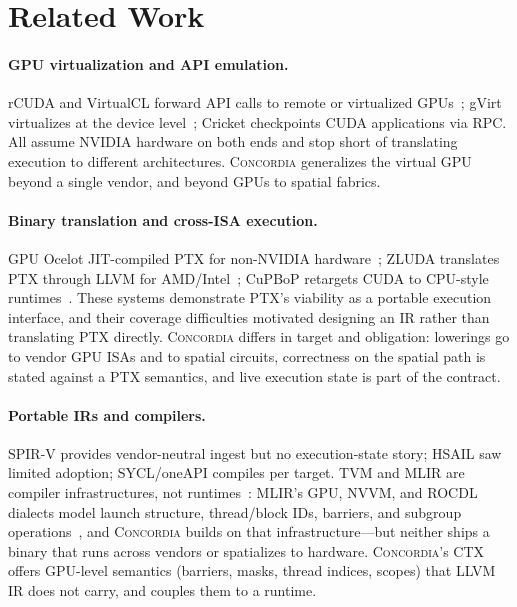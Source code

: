 \documentclass[sigplan,nonacm]{acmart}
\newcommand{\sys}{\textsc{Concordia}\xspace}
\begin{document}
\section{Related Work}
\label{sec:related}

\paragraph{GPU virtualization and API emulation.} rCUDA and VirtualCL
forward API calls to remote or virtualized
GPUs~\cite{pavlidakis2024scale,kato2012gdev}; gVirt virtualizes at the
device level~\cite{gvim}; Cricket checkpoints CUDA applications via RPC.
All assume NVIDIA hardware on both ends and stop short of translating
execution to different architectures.  \sys generalizes the virtual GPU
beyond a single vendor, and beyond GPUs to spatial fabrics.

\paragraph{Binary translation and cross-ISA execution.} GPU Ocelot
JIT-compiled PTX for non-NVIDIA hardware~\cite{diamos2010ocelot}; ZLUDA
translates PTX through LLVM for AMD/Intel~\cite{zluda,janik_zluda}; CuPBoP
retargets CUDA to CPU-style runtimes~\cite{huang2023cupbop}.  These systems
demonstrate PTX's viability as a portable execution interface, and their
coverage difficulties motivated designing an IR rather than translating
PTX directly.  \sys differs in target and obligation: lowerings go to
vendor GPU ISAs and to spatial circuits, correctness on the spatial path is
stated against a PTX semantics, and live execution state is part of the
contract.

\paragraph{Portable IRs and compilers.} SPIR-V provides vendor-neutral
ingest but no execution-state story; HSAIL saw limited adoption;
SYCL/oneAPI compiles per target.  TVM and MLIR are compiler
infrastructures, not runtimes~\cite{chen2018tvm,lattner2021mlir}: MLIR's
GPU, NVVM, and ROCDL dialects model launch structure, thread/block IDs,
barriers, and subgroup operations~\cite{mlir_gpu_dialect,
mlir_nvvm_dialect,mlir_rocdl_dialect}, and \sys builds on that
infrastructure---but neither ships a binary that runs across vendors or
spatializes to hardware.  \sys's CTX offers GPU-level semantics (barriers,
masks, thread indices, scopes) that LLVM IR does not carry, and couples
them to a runtime.
\end{document}
